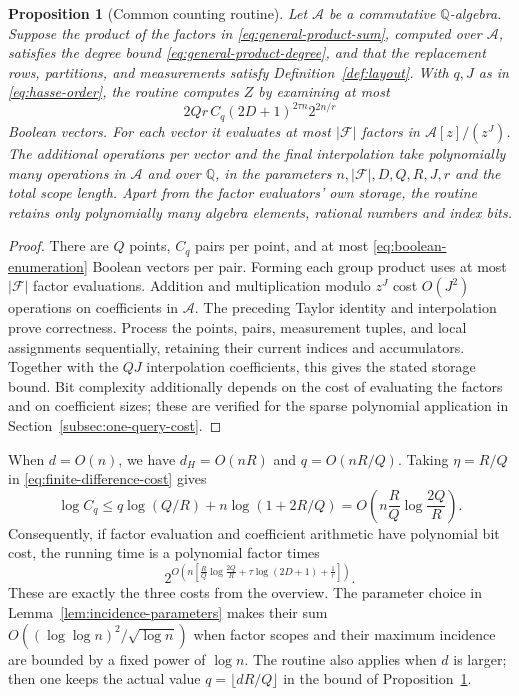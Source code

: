 \documentclass[11pt,reqno]{amsart}
\numberwithin{equation}{section}
\newtheorem{proposition}[theorem]{Proposition}
\theoremstyle{definition}\newtheorem{definition}[theorem]{Definition}
\theoremstyle{remark}\newtheorem{remark}[theorem]{Remark}
\renewcommand{\le}{\leqslant}
\begin{document}
\begin{proposition}[Common counting routine]\label{prop:general-count}
Let $\mathcal A$ be a commutative $\mathbb Q$-algebra. Suppose the
product of the factors in \eqref{eq:general-product-sum}, computed
over $\mathcal A$, satisfies the degree bound \eqref{eq:general-product-degree},
and that the replacement rows, partitions, and measurements satisfy
Definition~\ref{def:layout}. With $q,J$ as in \eqref{eq:hasse-order},
the routine computes $Z$ by examining at most
\[
 2Qr\,C_q(2D+1)^{2\tau n}2^{2n/r}
\]
Boolean vectors. For each vector it evaluates at most $|\mathcal F|$
factors in $\mathcal A[z]/(z^J)$. The additional operations per
vector and the final interpolation take polynomially many operations
in $\mathcal A$ and over $\mathbb Q$, in the parameters
$n,|\mathcal F|,D,Q,R,J,r$ and the total scope length.
Apart from the factor evaluators' own storage, the routine retains
only polynomially many algebra elements, rational numbers and index bits.
\end{proposition}
\begin{proof}
There are $Q$ points, $C_q$ pairs per point, and at most
\eqref{eq:boolean-enumeration} Boolean vectors per pair.
Forming each group product uses at most $|\mathcal F|$ factor evaluations.
Addition and multiplication modulo $z^J$ cost $O(J^2)$ operations
on coefficients in $\mathcal A$. The preceding Taylor identity
and interpolation prove correctness.
Process the points, pairs, measurement tuples, and local assignments
sequentially, retaining their current indices and accumulators.
Together with the $QJ$ interpolation coefficients, this gives the
stated storage bound. Bit complexity additionally depends on the
cost of evaluating the factors and on coefficient sizes; these are
verified for the sparse polynomial application in
Section~\ref{subsec:one-query-cost}.
\end{proof}

When $d=O(n)$, we have $d_H=O(nR)$ and $q=O(nR/Q)$.
Taking $\eta=R/Q$ in \eqref{eq:finite-difference-cost} gives
\[
 \log C_q\le q\log(Q/R)+n\log(1+2R/Q)
     =O\!\left(n\frac RQ\log\frac{2Q}{R}\right).
\]
Consequently, if factor evaluation and coefficient arithmetic have
polynomial bit cost, the running time is a polynomial factor times
\begin{equation}\label{eq:three-costs}
 2^{O\left(n\left[
       \frac RQ\log\frac{2Q}{R}
       +\tau\log(2D+1)+\frac1r\right]\right)}.
\end{equation}
These are exactly the three costs from the overview. The parameter
choice in Lemma~\ref{lem:incidence-parameters} makes their sum
$O((\log\log n)^2/\sqrt{\log n})$ when factor scopes and their
maximum incidence are bounded by a fixed power of $\log n$.
The routine also applies when $d$ is larger; then one keeps the
actual value $q=\lfloor dR/Q\rfloor$ in the bound of
Proposition~\ref{prop:general-count}.
\end{document}
